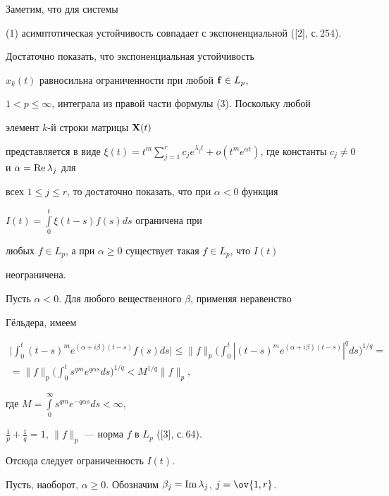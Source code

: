 \begin{pf} 


Заметим, что для системы 


(1) асимптотическая устойчивость совпадает с экспоненциальной ([2], с.\,254). 


Достаточно показать, что экспоненциальная устойчивость 


$x_k(t)$ равносильна ограниченности при любой $\bold f\in L_p$, 


$1<p\le\infty$, интеграла из правой части формулы (3). Поскольку любой 


элемент $k$-й строки матрицы $\bold X(t)$ 


представляется в виде $\xi(t)=t^m\sum\limits^r_{j=1}c_j e^{\lambda_j t} 


+o(t^m e^{\alpha t})$, где константы $c_j\ne0$ и $\alpha=\re\lambda_j$ для 


всех $1\le j\le r$, то достаточно показать, что при $\alpha<0$ функция 


$I(t)=\int\limits^t_0\xi(t-s)f(s)ds$ ограничена при 


любых $f\in L_p$, а при $\alpha\ge0$ существует такая $f\in L_p$, что $I(t)$ 


неограничена. 


 


Пусть $\alpha<0$. Для любого вещественного $\beta$, применяя неравенство 


Г\"ельдера, имеем 


\begin{multline*} 


\bigg|\int^t_0(t-s)^m e^{(\alpha+i\beta)(t-s)}f(s)ds\bigg|\le 


\|f\|_p\bigg(\int^t_0|(t-s)^m e^{(\alpha+i\beta)(t-s)}|^q ds 


\bigg)^{1/q}=\\ =\|f\|_p\bigg(\int^t_0 s^{qm}e^{q\alpha s}ds\bigg)^{1/q }


<M^{1/q}\|f\|_p, 


\end{multline*} 


где $M=\int\limits^\infty_0 s^{qm}e^{-q\alpha s}ds<\infty$, 


$\frac{1}{p}+\frac{1}{q}=1$, $\|f\|_p$ --- норма $f$ в $L_p$ ([3], с.\,64). 


Отсюда следует ограниченность $I(t)$. 


 


Пусть, наоборот, $\alpha\ge0$. Обозначим $\beta_j=\operatorname{Im}\lambda_j$, $j=\ov{1,r}$. 



\end{pf}
